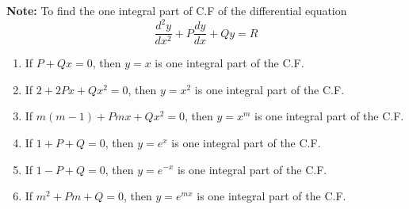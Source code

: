 \documentclass[a4paper, titlepage]{article}
\begin{document}
\textbf{Note: }To find the one integral part of C.F of the 
differential equation
\[ \dfrac{d^2y}{dx^2} + P\dfrac{dy}{dx} + Qy = R \]
\begin{enumerate}
    \item If $P + Qx = 0$, then $y = x$ is one integral part of the C.F.
    \item If $2 + 2Px + Qx^2 = 0$, then $y = x^2$ is one integral part of the C.F.
    \item If $m(m-1) + Pmx + Qx^2 = 0$, then $y = x^m$ is one integral part of the C.F.
    \item If $1 + P + Q = 0$, then $y = e^x$ is one integral part of the C.F.
    \item If $1 - P + Q = 0$, then $y = e^{-x}$ is one integral part of the C.F.
    \item If $m^2 + Pm + Q = 0$, then $y = e^{mx}$ is one integral part of the C.F.
\end{enumerate}
\end{document}
